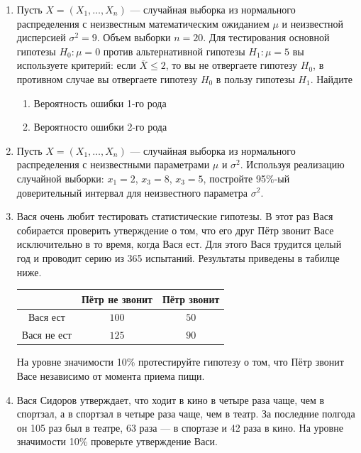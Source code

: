 \begin{enumerate}


	\item Пусть $X=(X_{1}, \ldots,X_{n})$ — случайная выборка из нормального распределения с неизвестным математическим ожиданием $\mu$ и неизвестной дисперсией $\sigma^2=9$. Объем выборки $n=20$. Для тестирования основной гипотезы $H_{0}:\mu=0$ против альтернативной гипотезы $H_{1}:\mu=5$ вы используете критерий: если $\overline{X}\leq2$, то вы не отвергаете гипотезу $H_{0}$, в противном случае вы отвергаете гипотезу $H_{0}$ в пользу гипотезы $H_{1}$. Найдите
	\begin{enumerate}
	\item Вероятность ошибки 1-го рода
	\item Вероятносто ошибки 2-го рода
	\end{enumerate}


		\item Пусть $X=(X_{1}, \ldots,X_{n})$ — случайная выборка из нормального распределения с неизвестными параметрами $\mu$ и $\sigma^2$. Используя реализацию случайной выборки: $x_{1}=2$, $x_{3}=8$, $x_{3}=5$, постройте 95\%-ый доверительный интервал для неизвестного параметра $\sigma^2$.


	\item Вася очень любит тестировать статистические гипотезы. В этот раз Вася собирается проверить утверждение о том, что его друг Пётр звонит Васе исключительно в то время, когда Вася ест. Для этого Вася трудится целый год и проводит серию из 365 испытаний. Результаты приведены в табилце ниже.

	\begin{center}
		\begin{tabular}{c|cc}
			\toprule
			& Пётр не звонит & Пётр звонит\\
			\midrule
			Вася ест & $100$ & $50$\\
			Вася не ест  & $125$ & $90$\\
			\bottomrule
		\end{tabular}
	\end{center}

	На уровне значимости 10\% протестируйте гипотезу о том, что Пётр звонит Васе независимо от момента приема пищи.


\item Вася Сидоров утверждает, что ходит в кино в четыре раза чаще, чем в спортзал, а в спортзал в четыре раза чаще, чем в театр.
За последние полгода он 105 раз был в театре, 63 раза — в спортазе и 42 раза в кино.
На уровне значимости 10\% проверьте утверждение Васи.

\end{enumerate}


